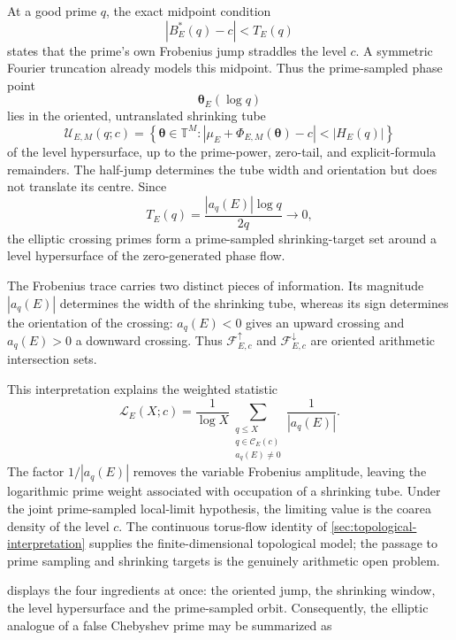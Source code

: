 \documentclass[11pt,reqno]{amsart}
\theoremstyle{remark}
\newcommand{\T}{\mathbb{T}}
\begin{document}
At a good prime $q$, the exact midpoint condition
\[
  |B_E^{*}(q)-c|<T_E(q)
\]
states that the prime's own Frobenius jump straddles the level $c$.  A symmetric Fourier truncation already models this midpoint.  Thus the prime-sampled phase point
\[
  \boldsymbol\theta_E(\log q)
\]
lies in the oriented, untranslated shrinking tube
\begin{equation}
  \mathcal U_{E,M}(q;c)
  =
  \left\{
  \boldsymbol\theta\in\T^M:
  \left|
  \mu_E+\Phi_{E,M}(\boldsymbol\theta)-c
  \right|<|H_E(q)|
  \right\}
  \label{eq:prime-dependent-tube}
\end{equation}
of the level hypersurface, up to the prime-power, zero-tail, and explicit-formula remainders.  The half-jump determines the tube width and orientation but does not translate its centre.
  Since
\[
  T_E(q)=\frac{|a_q(E)|\log q}{2q}\longrightarrow0,
\]
the elliptic crossing primes form a prime-sampled shrinking-target
set around a level hypersurface of the zero-generated phase flow.

The Frobenius trace carries two distinct pieces of information.
Its magnitude $|a_q(E)|$ determines the width of the shrinking tube,
whereas its sign determines the orientation of the crossing:
$a_q(E)<0$ gives an upward crossing and $a_q(E)>0$ a downward
crossing.  Thus $\mathcal F^{\uparrow}_{E,c}$ and
$\mathcal F^{\downarrow}_{E,c}$ are oriented arithmetic
intersection sets.

This interpretation explains the weighted statistic
\[
  \mathcal L_E(X;c)
  =
  \frac{1}{\log X}
  \sum_{\substack{q\leq X\\q\in\mathcal C_E(c)\\a_q(E)\neq0}}
  \frac{1}{|a_q(E)|}.
\]
The factor $1/|a_q(E)|$ removes the variable Frobenius amplitude,
leaving the logarithmic prime weight associated with occupation of
a shrinking tube.  Under the joint prime-sampled local-limit
hypothesis, the limiting value is the coarea density of the level
$c$.  The continuous torus-flow identity of
\cref{sec:topological-interpretation} supplies the finite-dimensional
topological model; the passage to prime sampling and shrinking
targets is the genuinely arithmetic open problem.

 displays the four ingredients at once: the
oriented jump, the shrinking window, the level hypersurface and the
prime-sampled orbit.  Consequently, the elliptic analogue of a false
Chebyshev prime may be summarized as
\begin{center}
\end{center}
\end{document}
